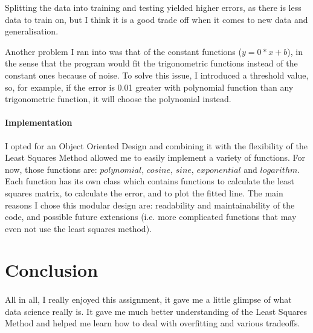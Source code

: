 \documentclass[notitlepage, 11pt]{report}
\begin{document}
	Splitting the data into training and testing yielded higher errors, as there is less data to train on, but I think it is a good trade off when it comes to new data and generalisation. 
	
	Another problem I ran into was that of the constant functions ($y = 0*x + b$), in the sense that the program would fit the trigonometric functions instead of the constant ones because of noise. To solve this issue, I introduced a threshold value, so, for example, if the error is 0.01 greater with polynomial function than any trigonometric function, it will choose the polynomial instead.
	
	\paragraph{Implementation}
	I opted for an Object Oriented Design and combining it with the flexibility of the Least Squares Method allowed me to easily implement a variety of functions. For now, those functions are: $polynomial$, $cosine$, $sine$, $exponential$ and $logarithm$. Each function has its own class which contains functions to calculate the least squares matrix, to calculate the error, and to plot the fitted line. The main reasons I chose this modular design are: readability and maintainability of the code, and possible future extensions (i.e. more complicated functions that may even not use the least squares method).
	
	\section{Conclusion}
	\paragraph*{}
	All in all, I really enjoyed this assignment, it gave me a little glimpse of what data science really is. It gave me much better understanding of the Least Squares Method and helped me learn how to deal with overfitting and various tradeoffs.
		
	
\end{document}
